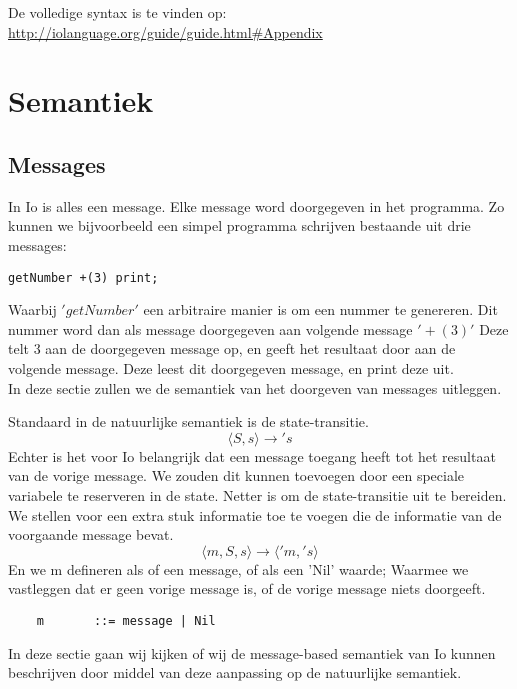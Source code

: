 \documentclass[12pt]{article}
\begin{document}
De volledige syntax is te vinden op: \url{http://iolanguage.org/guide/guide.html#Appendix}

\section{Semantiek}

\subsection{Messages}
In Io is alles een message. Elke message word doorgegeven in het programma. Zo kunnen we bijvoorbeeld een simpel programma schrijven bestaande uit drie messages:
\begin{lstlisting}[frame=single]
getNumber +(3) print;
\end{lstlisting}
Waarbij \('getNumber'\) een arbitraire manier is om een nummer te genereren. Dit nummer word dan als message doorgegeven aan volgende message \('+(3)'\) Deze telt \(3\) aan de doorgegeven message op, en geeft het resultaat door aan de volgende message. Deze leest dit doorgegeven message, en print deze uit.\\
In deze sectie zullen we de semantiek van het doorgeven van messages uitleggen.\par
Standaard in de natuurlijke semantiek is de state-transitie.
\[\langle S,s \rangle \rightarrow \prime s\] Echter is het voor Io belangrijk dat een message toegang heeft tot het resultaat van de vorige message. We zouden dit kunnen toevoegen door een speciale variabele te reserveren in de state. Netter is om de state-transitie uit te bereiden. We stellen voor een extra stuk informatie toe te voegen die de informatie van de voorgaande message bevat.
\[\langle m,S,s \rangle \rightarrow \langle \prime m,\prime s \rangle\]
En we m defineren als of een message, of als een 'Nil' waarde; Waarmee we vastleggen dat er geen vorige message is, of de vorige message niets doorgeeft.
\begin{lstlisting}
	m		::= message | Nil
\end{lstlisting}
In deze sectie gaan wij kijken of wij de message-based semantiek van Io kunnen beschrijven door middel van deze aanpassing op de natuurlijke semantiek.
\end{document}
